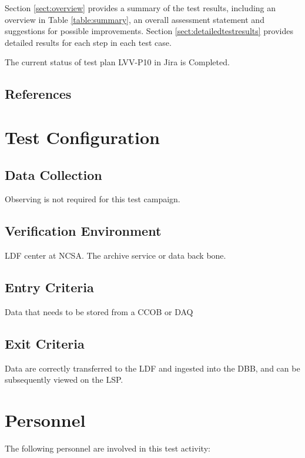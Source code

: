 \documentclass[DM,STR,toc]{lsstdoc}
\begin{document}
Section \ref{sect:overview} provides a summary of the test results, including an overview in Table \ref{table:summary}, an overall assessment statement and suggestions for possible improvements.
Section \ref{sect:detailedtestresults} provides detailed results for each step in each test case.

The current status of test plan LVV-P10 in Jira is Completed.

\subsection{References}
\label{sect:references}
\renewcommand{\refname}{}

\section{Test Configuration}
\label{sect:configuration}

\subsection{Data Collection}

  Observing is not required for this test campaign.

\subsection{Verification Environment}
\label{sect:hwconf}
  LDF center at NCSA. The archive service or data back bone.


  \subsection{Entry Criteria}
  Data that needs to be stored from a CCOB or DAQ


  \subsection{Exit Criteria}
  Data are correctly transferred to the LDF and ingested into the DBB, and
can be subsequently viewed on the LSP.



\section{Personnel}
\label{sect:personnel}

The following personnel are involved in this test activity:
\end{document}
